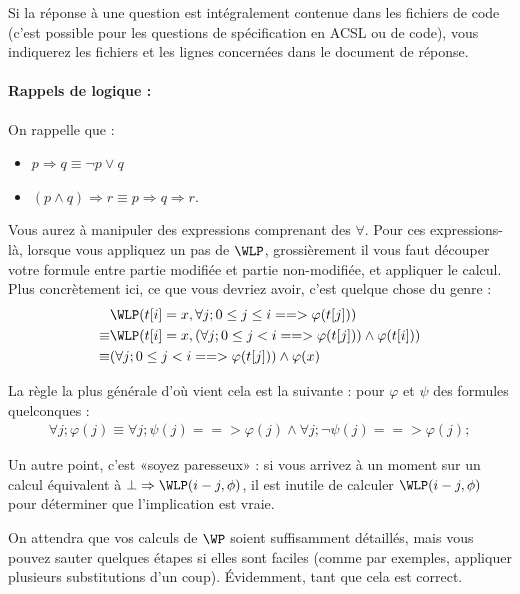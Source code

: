 \documentclass[11pt,answers]{exam}
\begin{document}
Si la réponse à une question est intégralement contenue dans les fichiers de code (c’est possible pour les questions de spécification en ACSL ou de code), vous indiquerez les fichiers et les lignes concernées dans le document de réponse.


\paragraph{Rappels de logique :}

On rappelle que :
\begin{itemize}
    \item $p \Rightarrow q \equiv \neg p \vee q$
    \item $(p \wedge q) \Rightarrow r \equiv p \Rightarrow q \Rightarrow r$.
\end{itemize}

Vous aurez à manipuler des expressions comprenant des $\forall$. Pour ces expressions-là, lorsque vous appliquez un pas de $\WLP$, grossièrement il vous faut découper votre formule entre partie modifiée et partie non-modifiée, et appliquer le calcul. Plus concrètement ici, ce que vous devriez avoir, c’est quelque chose du genre :
\begin{align*}
    & \WLP(t[i] = x,\forall j; 0 \leq j \leq i ==> \varphi(t[j]))\\
    \equiv & \WLP(t[i] = x,(\forall j; 0 \leq j < i ==> \varphi(t[j])) \wedge \varphi(t[i]))\\
    \equiv & (\forall j; 0 \leq j < i ==> \varphi(t[j])) \wedge \varphi(x)
\end{align*}

La règle la plus générale d’où vient cela est la suivante : pour $\varphi$ et $\psi$ des formules quelconques :
\begin{align*}
    \forall j; \varphi(j) \equiv \forall j; \psi(j) ==> \varphi(j) \wedge \forall j; \neg \psi(j) ==> \varphi(j);
\end{align*}

Un autre point, c’est «soyez paresseux» : si vous arrivez à un moment sur un calcul équivalent à $\bot \Rightarrow \WLP(i-j,\phi)$, il est inutile de calculer $\WLP(i-j,\phi)$ pour déterminer que l’implication est vraie.

On attendra que vos calculs de $\WP$ soient suffisamment détaillés, mais vous pouvez sauter quelques étapes si elles sont faciles (comme par exemples, appliquer plusieurs substitutions d’un coup). Évidemment, tant que cela est correct.
\end{document}

